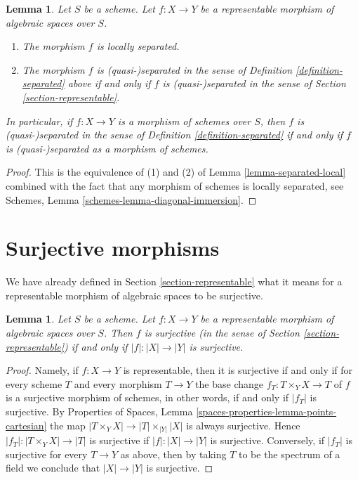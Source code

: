 \documentclass{stacks-project}
\theoremstyle{plain}
\newtheorem{lemma}[subsection]{Lemma}
\theoremstyle{definition}
\theoremstyle{remark}
\numberwithin{equation}{subsection}
\begin{document}
\begin{lemma}
\label{lemma-match-separated}
Let $S$ be a scheme.
Let $f : X \to Y$ be a representable morphism of algebraic spaces over $S$.
\begin{enumerate}
\item The morphism $f$ is locally separated.
\item The morphism $f$ is (quasi-)separated in the sense of
Definition \ref{definition-separated}
above if and only if $f$ is (quasi-)separated in the sense of
Section \ref{section-representable}.
\end{enumerate}
In particular, if $f : X \to Y$ is a morphism of schemes over $S$, then
$f$ is (quasi-)separated in the sense of
Definition \ref{definition-separated}
if and only if $f$ is (quasi-)separated as a morphism of schemes.
\end{lemma}

\begin{proof}
This is the equivalence of (1) and (2) of
Lemma \ref{lemma-separated-local}
combined with the fact that any morphism of schemes is locally separated, see
Schemes, Lemma \ref{schemes-lemma-diagonal-immersion}.
\end{proof}











\section{Surjective morphisms}
\label{section-surjective}

\noindent
We have already defined in Section \ref{section-representable}
what it means for a representable morphism of algebraic spaces
to be surjective.

\begin{lemma}
\label{lemma-surjective-representable}
Let $S$ be a scheme. Let $f : X \to Y$ be a representable
morphism of algebraic spaces over $S$. Then
$f$ is surjective (in the sense of Section \ref{section-representable})
if and only if $|f| : |X| \to |Y|$ is surjective.
\end{lemma}

\begin{proof}
Namely, if $f : X \to Y$ is representable, then it is surjective if and only if
for every scheme $T$ and every morphism $T \to Y$ the base change
$f_T : T \times_Y X \to T$ of $f$ is a surjective morphism of schemes,
in other words, if and only if $|f_T|$ is surjective. By
Properties of Spaces, Lemma \ref{spaces-properties-lemma-points-cartesian}
the map $|T \times_Y X| \to |T| \times_{|Y|} |X|$ is always surjective.
Hence $|f_T| : |T \times_Y X| \to |T|$ is surjective if $|f| : |X| \to |Y|$
is surjective. Conversely, if $|f_T|$ is surjective
for every $T \to Y$ as above, then by taking $T$ to be the spectrum of a
field we conclude that $|X| \to |Y|$ is surjective.
\end{proof}
\end{document}
